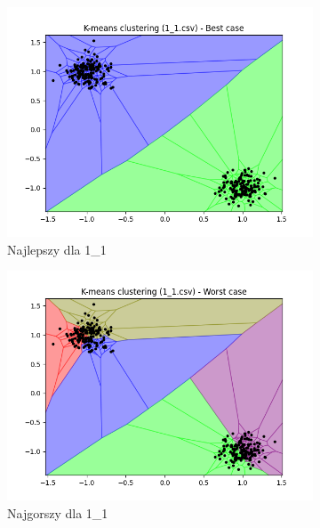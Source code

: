 \documentclass[12pt]{article}
\begin{document}
\begin{figure}[H]
    \centering
    \begin{subfigure}[b]{0.24\textwidth}
        \includegraphics[width=\linewidth]{img/exp_1/kmeans/1_1_best.png}
        \caption{Najlepszy dla 1\_1}
    \end{subfigure}
    \hfill
    \begin{subfigure}[b]{0.24\textwidth}
        \includegraphics[width=\linewidth]{img/exp_1/kmeans/1_1_worst.png}
        \caption{Najgorszy dla 1\_1}
    \end{subfigure}
    \hfill
    \begin{subfigure}[b]{0.24\textwidth}

\end{subfigure}
\end{figure}
\end{document}
